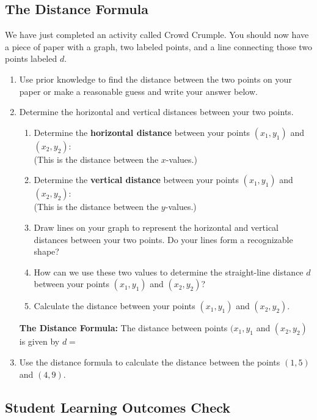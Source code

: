 \subsection{The Distance Formula}
\noindent We have just completed an activity called Crowd Crumple.  You should now have a piece of paper with a graph, two labeled points, and a line connecting those two points labeled $d$.
\begin{enumerate}
\item Use prior knowledge to find the distance between the two points on your paper or make a reasonable guess and write your answer below.\\[.5in]

\item Determine the horizontal and vertical distances between your two points.
\begin{enumerate}
\item Determine the \textbf{horizontal distance} between your points $(x_1,y_1)$ and $(x_2,y_2)$:\\
(This is the distance between the $x$-values.)\\[.5in]
\item Determine the \textbf{vertical distance} between your points $(x_1,y_1)$ and $(x_2,y_2)$:\\
(This is the distance between the $y$-values.)\\[.5in]
\item Draw lines on your graph to represent the horizontal and vertical distances between your two points.  Do your lines form a recognizable shape?\\[.5in]
\item How can we use these two values to determine the straight-line distance $d$ between your points $(x_1,y_1)$ and $(x_2,y_2)$?\\[.5in]
\item Calculate the distance between your points $(x_1,y_1)$ and $(x_2,y_2)$.

\end{enumerate}
\vfill


\newpage


\noindent \textbf{The Distance Formula:}  The distance between points $(x_1,y_1$ and $(x_2,y_2)$ is given by $d=$

\vfill
\item Use the distance formula to calculate the distance between the points $(1,5)$ and $(4,9)$.
\end{enumerate}
\vfill
\vfill
\vfill
\subsection{Student Learning Outcomes Check}

